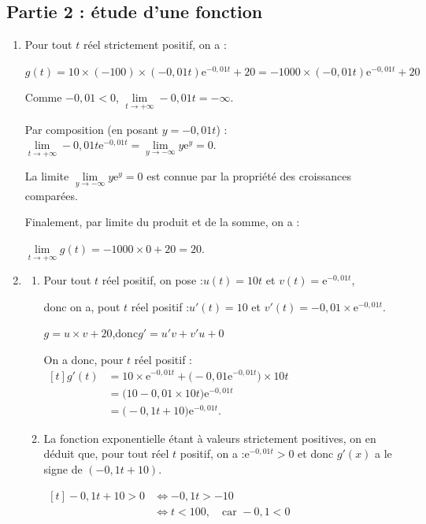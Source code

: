 \documentclass[10pt]{article}
\providecommand{\e}{{\mathrm{e}}}
\begin{document}
\subsection*{Partie 2 : étude d'une fonction}

\begin{enumerate}
	\item Pour tout $t$ réel strictement positif, on a :

$g(t) = 10 \times (-100) \times (-0,01t)\e^{-0,01t} + 20=-1000 \times (-0,01t)\e^{-0,01t} + 20$

Comme $-0,01 < 0$, \quad$\lim\limits_{t \to +\infty} -0,01t = -\infty$.

Par composition (en posant $y = -0,01t$) :\quad $\lim\limits_{t \to +\infty} -0,01t \e^{-0,01t} = \lim\limits_{y \to -\infty} y\e^{y} = 0$.

La limite $\lim\limits_{y \to -\infty} y\e^{y} = 0$ est connue par la propriété des croissances comparées.

Finalement, par limite du produit et de la somme, on a :

$\lim\limits_{t \to +\infty} g(t) = -1000 \times 0 + 20 = 20$.

	\item \begin{enumerate}
		\item Pour tout $t$ réel positif, on pose :\quad $u(t) = 10t$ \quad et \quad $v(t) = \e^{-0,01t}$,

donc on a, pout $t$ réel positif :\quad $u'(t) = 10$ \quad et \quad $v'(t) = -0,01 \times \e^{-0,01t}$.

$g = u\times v + 20$,\quad donc\quad $g' = u'v+v'u + 0$

On a donc, pour $t$ réel positif : \quad $  \begin{aligned}[t] g'(t) &= 10 \times \e^{-0,01t} + \big(-0,01\e^{-0,01t}\big)\times 10t\\
		&= \big(10 - 0,01\times 10t\big)\e^{-0,01t}\\
		&= \big(-0,1 t + 10\big) \e^{-0,01 t}.\end{aligned}$

		\item La fonction exponentielle étant à valeurs strictement positives, on en déduit que, pour tout réel $t$ positif, on a :\quad $\e^{-0,01t} >0$ \quad et donc $g'(x)$ a le signe de \quad $(-0,1t+ 10)$.

$\begin{aligned}[t] -0,1t + 10 > 0 &\iff -0,1t > -10\\
&\iff t < 100,\quad \text{car }  -0,1 < 0\end{aligned}$


\end{enumerate}
\end{enumerate}
\end{document}
